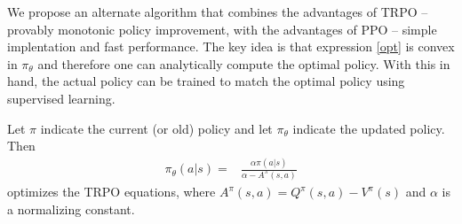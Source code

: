\documentclass{article}
\begin{document}
We propose an alternate algorithm that combines the advantages of TRPO --
provably monotonic policy improvement, with the advantages of PPO -- simple
implentation and fast performance.
The key idea is that expression \ref{opt} is convex in $\pi_\theta$ and
therefore one can analytically compute the optimal policy. With this in hand,
the actual policy can be trained to match the optimal policy using supervised
learning.
\begin{theoremrep}
	Let $\pi$ indicate the current (or old) policy and let $\pi_\theta$ indicate
	the updated policy. Then
	\begin{align}
    \pi_\theta(a|s) = & \frac{\alpha\pi(a|s)}{\alpha - A^\pi(s, a)}
	\end{align}
	optimizes the TRPO equations, where $A^\pi(s, a) = Q^\pi(s, a) - V^\pi(s)$ and
  $\alpha$ is a normalizing constant.
\end{theoremrep}
\end{document}

